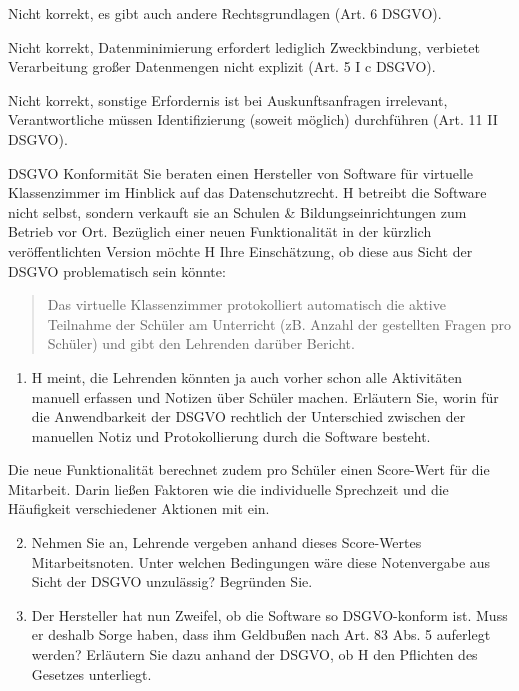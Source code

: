 \documentclass{exercisesheet}
\begin{document}
\begin{solutions}
  \item Nicht korrekt, es gibt auch andere Rechtsgrundlagen (Art. 6 DSGVO).
  \item Nicht korrekt, Datenminimierung erfordert lediglich Zweckbindung, verbietet Verarbeitung großer Datenmengen nicht explizit (Art. 5 I c DSGVO).
  \item Nicht korrekt, sonstige Erfordernis ist bei Auskunftsanfragen irrelevant, Verantwortliche müssen Identifizierung (soweit möglich) durchführen (Art. 11 II DSGVO).
\end{solutions}


\begin{exercise}{DSGVO Konformität}
  Sie beraten einen Hersteller von Software für virtuelle Klassenzimmer im Hinblick auf das Datenschutzrecht. H betreibt die Software nicht selbst, sondern verkauft sie an Schulen \& Bildungseinrichtungen zum Betrieb vor Ort. Bezüglich einer neuen Funktionalität in der kürzlich veröffentlichten Version möchte H Ihre Einschätzung, ob diese aus Sicht der DSGVO problematisch sein könnte:
  \begin{quote}
    Das virtuelle Klassenzimmer protokolliert automatisch die aktive Teilnahme der Schüler am Unterricht (zB. Anzahl der gestellten Fragen pro Schüler) und gibt den Lehrenden darüber Bericht.
  \end{quote}

  \begin{enumerate}
    \item H meint, die Lehrenden könnten ja auch vorher schon alle Aktivitäten manuell erfassen und Notizen über Schüler machen. Erläutern Sie, worin für die Anwendbarkeit der DSGVO rechtlich der Unterschied zwischen der manuellen Notiz und Protokollierung durch die Software besteht.
  \end{enumerate}

  Die neue Funktionalität berechnet zudem pro Schüler einen Score-Wert für die Mitarbeit. Darin ließen Faktoren wie die individuelle Sprechzeit und die Häufigkeit verschiedener Aktionen mit ein.

  \begin{enumerate}
    \setcounter{enumi}{1}
    \item Nehmen Sie an, Lehrende vergeben anhand dieses Score-Wertes Mitarbeitsnoten. Unter welchen Bedingungen wäre diese Notenvergabe aus Sicht der DSGVO unzulässig? Begründen Sie.
    \item Der Hersteller hat nun Zweifel, ob die Software so DSGVO-konform ist. Muss er deshalb Sorge haben, dass ihm Geldbußen nach Art. 83 Abs. 5 auferlegt werden? Erläutern Sie dazu anhand der DSGVO, ob H den Pflichten des Gesetzes unterliegt.
  \end{enumerate}
\end{exercise}
\end{document}
